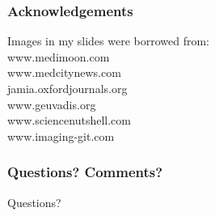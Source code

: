 \documentclass[10pt,dvipsnames,table, notes]{beamer}
\begin{document}
\begin{frame}
\frametitle{Acknowledgements}
Images in my slides were borrowed from: \\
www.medimoon.com \\
www.medcitynews.com \\
jamia.oxfordjournals.org \\
www.geuvadis.org \\
www.sciencenutshell.com \\
www.imaging-git.com \\

\end{frame}

\begin{frame}
\frametitle{Questions? Comments?}
Questions?
\end{frame}
\end{document}
